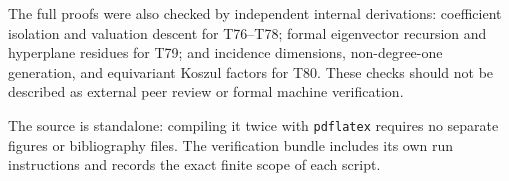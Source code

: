 \documentclass[11pt,a4paper]{article}
\theoremstyle{definition}
\theoremstyle{remark}\newtheorem{remark}[lemma]{Remark}
\begin{document}
The full proofs were also checked by independent internal derivations:
coefficient isolation and valuation descent for T76--T78; formal eigenvector
recursion and hyperplane residues for T79; and incidence dimensions,
non-degree-one generation, and equivariant Koszul factors for T80.
These checks should not be described as external peer review or formal
machine verification.

The source is standalone: compiling it twice with \texttt{pdflatex} requires
no separate figures or bibliography files. The verification bundle includes
its own run instructions and records the exact finite scope of each script.


\end{document}
